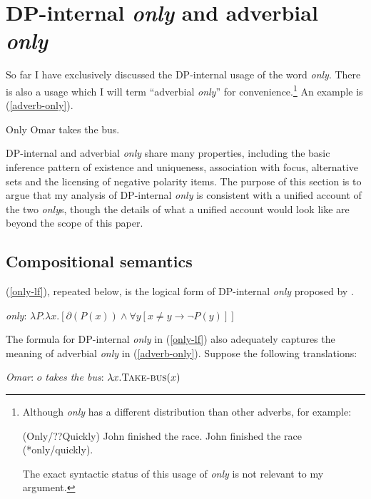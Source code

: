 \section{DP-internal \textit{only} and adverbial \textit{only} \label{sec:two-onlys}}
So far I have exclusively discussed the DP-internal usage of the word \textit{only}. There is also a usage which I will term ``adverbial \textit{only}'' for convenience.\footnote{Although \textit{only} has a different distribution than other adverbs, for example: \begin{exe} \ex (Only/??Quickly) John finished the race. \ex John finished the race (*only/quickly). \end{exe} The exact syntactic status of this usage of \textit{only} is not relevant to my argument.} An example is (\ref{adverb-only}).

\begin{exe}
	\ex \label{adverb-only} Only Omar takes the bus.
\end{exe}

DP-internal and adverbial \textit{only} share many properties, including the basic inference pattern of existence and uniqueness, association with focus, alternative sets and the licensing of negative polarity items. The purpose of this section is to argue that my analysis of DP-internal \textit{only} is consistent with a unified account of the two \textit{only}s, though the details of what a unified account would look like are beyond the scope of this paper.

\subsection{Compositional semantics}
(\ref{only-lf}), repeated below, is the logical form of DP-internal \textit{only} proposed by \citet{cb2015}.

\begin{exe}
	 \textit{only}: $ \lambda P . \lambda x . [ \partial(P(x)) \land \forall y [ x \ne y \to \neg P(y) ] ] $
\end{exe}

The formula for DP-internal \textit{only} in (\ref{only-lf}) also adequately captures the meaning of adverbial \textit{only} in (\ref{adverb-only}). Suppose the following translations:

\begin{exe}
	\ex \textit{Omar}: $o$
	\ex \textit{takes the bus}: $\lambda x . \textsc{Take-bus}(x)$
\end{exe}

